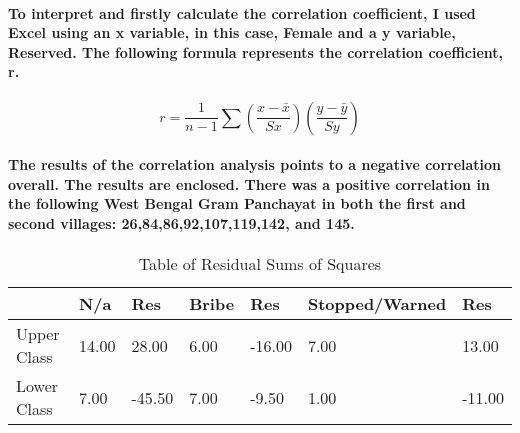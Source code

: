 \documentclass[10pt,a4paper]{article}
\begin{document}
	\paragraph{To interpret and firstly calculate the correlation coefficient, I used Excel using an x variable, in this case, Female and a y variable, Reserved. The following formula represents the correlation coefficient, r.}
	\begin{equation}
	r = \frac{1}{n-1}\sum(\frac{x-\bar{x}}{Sx})(\frac{y-\bar{y}}{Sy})
	\end{equation}
	\paragraph{The results of the correlation analysis points to a negative correlation overall. The results are enclosed. There was a positive correlation in the following West Bengal Gram Panchayat in both the first and second villages: 26,84,86,92,107,119,142, and 145.}
	\begin{table}
		\begin{center}
			\caption{Table of Residual Sums of Squares}
			\label{tab:table1}
			\begin{tabular}{l|l|l|l|l|l|l}
				\textbf{}&\textbf{N/a}&\textbf{Res}&\textbf{Bribe}&\textbf{Res}&\textbf{Stopped/Warned}&\textbf{Res}\\
				\hline
				Upper Class & 14.00 & 28.00 & 6.00 & -16.00 & 7.00 & 13.00\\
				Lower Class & 7.00 & -45.50 & 7.00 & -9.50 & 1.00 & -11.00\\
				\end{tabular}
		\end{center}
	\end{table}
\end{document}
